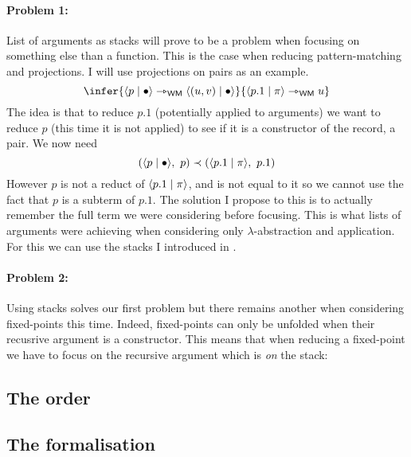 \paragraph{Problem 1:}
List of arguments as stacks will prove to be a problem when focusing on
something else than a function. This is the case when reducing pattern-matching
and projections. I will use projections on pairs as an example.
\[
  \infer
    {\dpair{p \mid \ctxempty} \red_\WM \dpair{(u,v) \mid \ctxempty}}
    {\dpair{p.1 \mid \pi} \red_\WM u}
\]
The idea is that to reduce \(p.1\) (potentially applied to arguments) we want to
reduce \(p\) (this time it is not applied) to see if it is a constructor of the
record, \ie a pair.
We now need
\[
  (\langle p \mid \bullet \rangle,\ p) \prec (\langle p.1 \mid \pi \rangle,\ p.1)
\]
However \(p\) is not a reduct of \(\langle p.1 \mid \pi \rangle\), and is not equal to
it so we cannot use the fact that \(p\) is a subterm of \(p.1\).
The solution I propose to this is to actually remember the full term we were
considering before focusing. This is what lists of arguments were achieving
when considering only \(\lambda\)-abstraction and application.
For this we can use the stacks I introduced in .

\paragraph{Problem 2:}
Using stacks solves our first problem but there remains another when considering
fixed-points this time. Indeed, fixed-points can only be unfolded when their
recusrive argument is a constructor. This means that when reducing a fixed-point
we have to focus on the recursive argument which is \emph{on} the stack:

\subsection{The order}

\subsection{The \Coq formalisation}